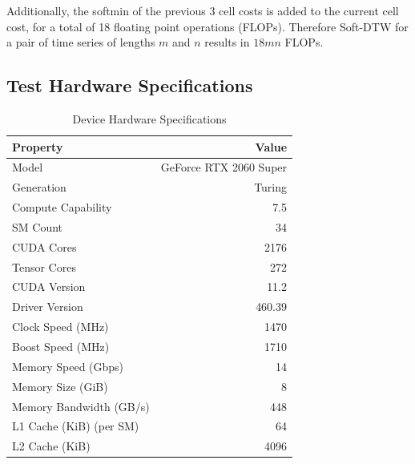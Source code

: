 \documentclass[12pt, letterpaper]{article}
\begin{document}
Additionally, the softmin of the previous 3 cell costs is added to the current
cell cost, for a total of 18 floating point operations (FLOPs). Therefore
Soft-DTW for a pair of time series of lengths $m$ and $n$ results in $18mn$
FLOPs.

\subsection{Test Hardware Specifications}
\FloatBarrier
\begin{table}[htbp]
  \centering
  \caption{Device Hardware Specifications}
  \label{specs}
  \begin{tabular}{lr}
      \toprule
          Property                & Value                           \\
          \midrule
          Model                   & GeForce RTX 2060 Super          \\
          Generation              & Turing                          \\
          Compute Capability      & 7.5                             \\
          SM Count                & 34                              \\
          CUDA Cores              & 2176                            \\
          Tensor Cores            & 272                             \\
          CUDA Version            & 11.2                            \\
          Driver Version          & 460.39                          \\
          Clock Speed (MHz)       & 1470                            \\
          Boost Speed (MHz)       & 1710                            \\
          Memory Speed (Gbps)     & 14                              \\
          Memory Size (GiB)       & 8                               \\
          Memory Bandwidth (GB/s) & 448                             \\
          L1 Cache (KiB) (per SM) & 64                              \\
          L2 Cache (KiB)          & 4096                            \\
          \bottomrule
  \end{tabular}
\end{table}
\end{document}
